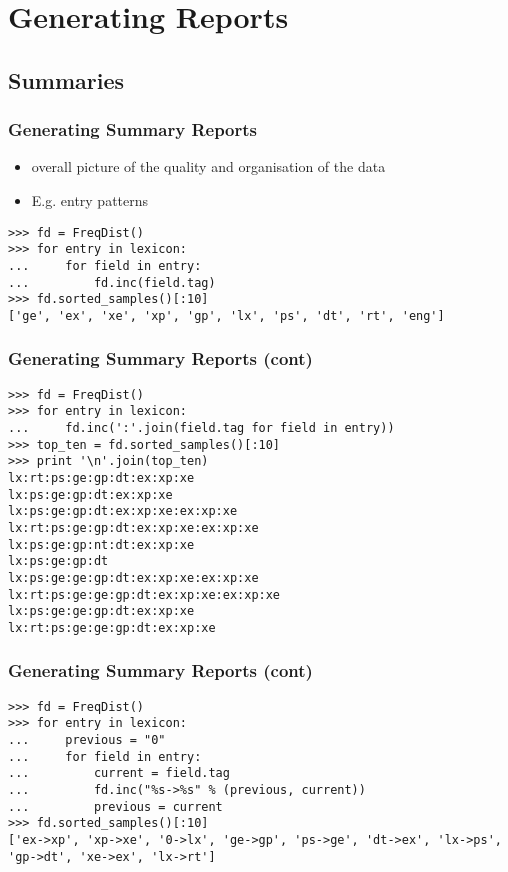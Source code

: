\documentclass{beamer}             %
\begin{document}
\section{Generating Reports}

\subsection{Summaries}

\begin{frame}[fragile]
\frametitle{Generating Summary Reports}
\begin{itemize}
\item overall picture of the quality and organisation of the data
\item E.g. entry patterns
\end{itemize}

\small
\begin{verbatim}
>>> fd = FreqDist()
>>> for entry in lexicon:
...     for field in entry:
...	        fd.inc(field.tag)
>>> fd.sorted_samples()[:10]
['ge', 'ex', 'xe', 'xp', 'gp', 'lx', 'ps', 'dt', 'rt', 'eng']
\end{verbatim}
\end{frame}

\begin{frame}[fragile]
\frametitle{Generating Summary Reports (cont)}
\small

\begin{verbatim}
>>> fd = FreqDist()
>>> for entry in lexicon:
...	    fd.inc(':'.join(field.tag for field in entry))
>>> top_ten = fd.sorted_samples()[:10]
>>> print '\n'.join(top_ten)
lx:rt:ps:ge:gp:dt:ex:xp:xe
lx:ps:ge:gp:dt:ex:xp:xe
lx:ps:ge:gp:dt:ex:xp:xe:ex:xp:xe
lx:rt:ps:ge:gp:dt:ex:xp:xe:ex:xp:xe
lx:ps:ge:gp:nt:dt:ex:xp:xe
lx:ps:ge:gp:dt
lx:ps:ge:ge:gp:dt:ex:xp:xe:ex:xp:xe
lx:rt:ps:ge:ge:gp:dt:ex:xp:xe:ex:xp:xe
lx:ps:ge:ge:gp:dt:ex:xp:xe
lx:rt:ps:ge:ge:gp:dt:ex:xp:xe
\end{verbatim}
\end{frame}

\begin{frame}[fragile]
\frametitle{Generating Summary Reports (cont)}
\small

\begin{verbatim}
>>> fd = FreqDist()
>>> for entry in lexicon:
...     previous = "0"
...     for field in entry:
...         current = field.tag
...         fd.inc("%s->%s" % (previous, current))
...         previous = current
>>> fd.sorted_samples()[:10]
['ex->xp', 'xp->xe', '0->lx', 'ge->gp', 'ps->ge', 'dt->ex', 'lx->ps',
'gp->dt', 'xe->ex', 'lx->rt']
\end{verbatim}
\end{frame}
\end{document}
